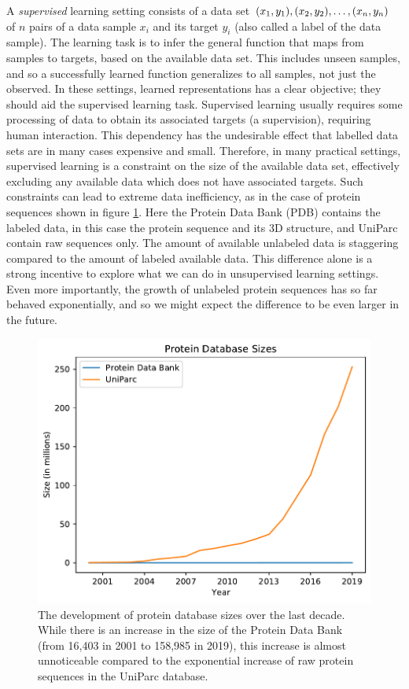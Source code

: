 A \textit{supervised} learning setting consists of a data set ${\mathopen{} \left( x_1, y_1 \right) \mathclose{}}, {\mathopen{} \left( x_2, y_2 \right) \mathclose{}}, \ldots, {\mathopen{} \left( x_n, y_n \right) \mathclose{}}$ of $n$ pairs of a data sample $x_i$ and its target $y_i$ (also called a label of the data sample). The learning task is to infer the general function that maps from samples to targets, based on the available data set. This includes unseen samples, and so a successfully learned function generalizes to all samples, not just the observed. In these settings, learned representations has a clear objective; they should aid the supervised learning task. Supervised learning usually requires some processing of data to obtain its associated targets (a supervision), requiring human interaction. This dependency has the undesirable effect that labelled data sets are in many cases expensive and small. Therefore, in many practical settings, supervised learning is a constraint on the size of the available data set, effectively excluding any available data which does not have associated targets. Such constraints can lead to extreme data inefficiency, as in the case of protein sequences shown in figure \ref{fig:data_increase}. Here the Protein Data Bank (PDB) contains the labeled data, in this case the protein sequence and its 3D structure, and UniParc contain raw sequences only. The amount of available unlabeled data is staggering compared to the amount of labeled available data. This difference alone is a strong incentive to explore what we can do in unsupervised learning settings. Even more importantly, the growth of unlabeled protein sequences has so far behaved exponentially, and so we might expect the difference to be even larger in the future.

\begin{figure}[ht]
    \centering
    \includegraphics[scale = 0.8]{report/figures/protein_size.pdf}
    \caption{The development of protein database sizes over the last decade. While there is an increase in the size of the Protein Data Bank (from 16,403 in 2001 to 158,985 in 2019), this increase is almost unnoticeable compared to the exponential increase of raw protein sequences in the UniParc database.}
    \label{fig:data_increase}
\end{figure}

